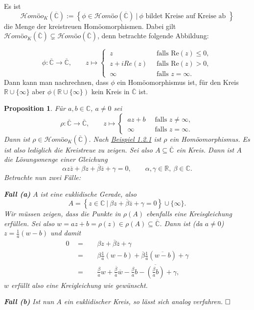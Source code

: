 \documentclass[11pt]{book}
\numberwithin{dummy}{section}
\newtheorem{proposition}[theorem]{Proposition}
\theoremstyle{nonumberbreak}
\newenvironment{pr}[1][]{\ifthenelse{\equal{#1}{}}{\proof}{\proof[#1]}\rm}{\endproof}
\newenvironment{definbem}[1][]{\ifthenelse{\equal{#1}{}}{\definibem}{\definibem[#1]}\rm}{\enddefinibem}
\newcommand{\C}{\mathbb{C}}
\newcommand{\CC}{\overline{\mathbb{C}}}
\newcommand{\la}{\longrightarrow}
\newcommand{\homoecc}{\mathcal{H}\textit{omöo}(\CC)}
\newcommand{\homoekcc}{\mathcal{H}\textit{omöo}_K(\CC)}
\begin{document}
\begin{spacing}{1.4}
\begin{definbem}
Es ist 
$$\homoekcc := \left\{ \phi \in \homoecc \ \vert \ \phi \textrm{ bildet Kreise auf Kreise ab } \right\}$$
die Menge der kreistreuen Homöomorphismen. Dabei gilt $\homoekcc \subsetneq \homoecc$, denn betrachte folgende Abbildung:

$$\phi: \CC \la \CC, \qquad z \mapsto \begin{cases} \ z& \ \textrm{ falls } \mathrm{Re}(z) \leqslant 0, \\ \ z + i Re(z) & \ \textrm{ falls } \mathrm{Re}(z) >0, \\ \ \infty & \ \textrm{ falls } z = \infty. \end{cases}$$
Dann kann man nachrechnen, dass $\phi$ ein Homöomorphismus ist, für den Kreis $\mathbb{R} \cup \{\infty\}$ aber $\phi(\mathbb{R} \cup \{\infty\})$ kein Kreis in $\CC$ ist.
\end{definbem}


\hypertarget{propeinszweidrei}{}
\begin{proposition}
Für $a,b \in \C$, $a \neq 0$ sei 
$$\rho: \CC \la \CC, \qquad z \mapsto \begin{cases} \ az + b & \ \textrm{ falls } z \neq \infty, \\ \ \infty & \ \textrm{ falls } z = \infty. \end{cases}$$
Dann ist $\rho \in \homoekcc$.
\begin{pr}
Nach \hyperlink{beispieleinszweieins}{Beispiel 1.2.1} ist $\rho$ ein Homöomorphismus. Es ist also lediglich die Kreistreue zu zeigen. Sei also $A \subseteq \CC$ ein Kreis. Dann ist $A$ die Lösungsmenge einer Gleichung
$$\alpha z \overline{z} + \beta z + \overline{\beta} \overline{z} + \gamma = 0, \qquad \alpha, \gamma \in \mathbb{R}, \ \beta \in \C.$$
Betrachte nun zwei Fälle:
\begin{compactenum}
\item[\textbf{Fall (a)}] $A$ ist eine euklidische Gerade, also 
$$A= \left\{ z \in \C \ \vert \ \beta z + \overline{\beta} \overline{z} + \gamma = 0 \right\} \cup \{\infty\}.$$
Wir müssen zeigen, dass die Punkte in $\rho(A)$ ebenfalls eine Kreisgleichung erfüllen. Sei also $w= az+b = \rho(z) \in \rho(A) \subseteq \CC$. Dann ist (da $a \neq 0$) $z= \frac{1}{a} (w-b)$ und damit
\setlength{\abovedisplayskip}{5.5pt}
\setlength{\belowdisplayskip}{5.5pt}
\begin{alignat*}{5}
0 \ \ &=&& \ \ \beta z + \overline{\beta} \overline{z} + \gamma \\
&=&& \ \ \beta \frac{1}{a}(w-b) + \overline{\beta} \frac{1}{a} (\overline{w-b}) + \gamma \\
&=&& \ \ \frac{\beta}{a} w + \frac{\overline{\beta}}{\overline{a}} \overline{w} - \frac{\beta}{a} b - \overline{\left(\frac{\beta}{a} b \right)} + \gamma,
\end{alignat*}
$w$ erfüllt also eine Kreigleichung wie gewünscht.
\item[\textbf{Fall (b)}] Ist nun $A$ ein euklidischer Kreis, so lässt sich analog verfahren. $\hfill \Box$
\end{compactenum}
\end{pr}




\end{proposition}
\end{spacing}
\end{document}
